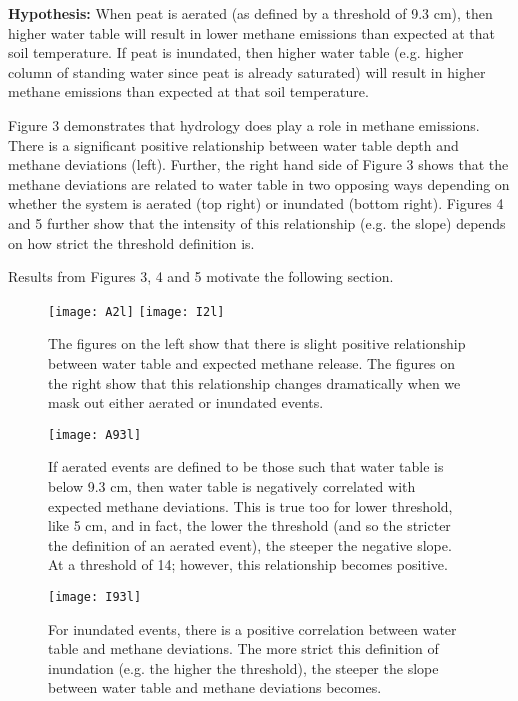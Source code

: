 \documentclass[12 pt]{article}
\begin{document}
\textbf{Hypothesis:}
When peat is aerated (as defined by a threshold of 9.3 cm), then higher water table will result in lower methane emissions than expected at that soil temperature. If peat is inundated, then higher water table (e.g. higher column of standing water since peat is already saturated) will result in higher methane emissions than expected at that soil temperature. 

Figure 3 demonstrates that hydrology does play a role in methane emissions. There is a significant positive relationship between water table depth and methane deviations (left). Further, the right hand side of Figure 3 shows that the methane deviations are related to water table in two opposing ways depending on whether the system is aerated (top right) or inundated (bottom right). Figures 4 and 5 further show that the intensity of this relationship (e.g. the slope) depends on how strict the threshold definition is. 

Results from Figures 3, 4 and 5 motivate the following section.

\begin{figure}[!htb]
\centering
\texttt{[image: A2l]}
\texttt{[image: I2l]}
\caption{The figures on the left show that there is slight positive relationship between water table and expected methane release. The figures on the right show that this relationship changes dramatically when we mask out either aerated or inundated events.  }
\end{figure}

\begin{figure}[!htb]
\centering
\texttt{[image: A93l]}
\caption{If aerated events are defined to be those such that water table is below 9.3 cm, then water table is negatively correlated with expected methane deviations. This is true too for lower threshold, like 5 cm, and in fact, the lower the threshold (and so the stricter the definition of an aerated event), the steeper the negative slope. At a threshold of 14; however, this relationship becomes positive.   }
\end{figure}

\begin{figure}[!htb]
\centering
\texttt{[image: I93l]}
\caption{For inundated events, there is a positive correlation between water table and methane deviations. The more strict this definition of inundation (e.g. the higher the threshold), the steeper the slope between water table and methane deviations becomes.    }
\end{figure}
\end{document}
